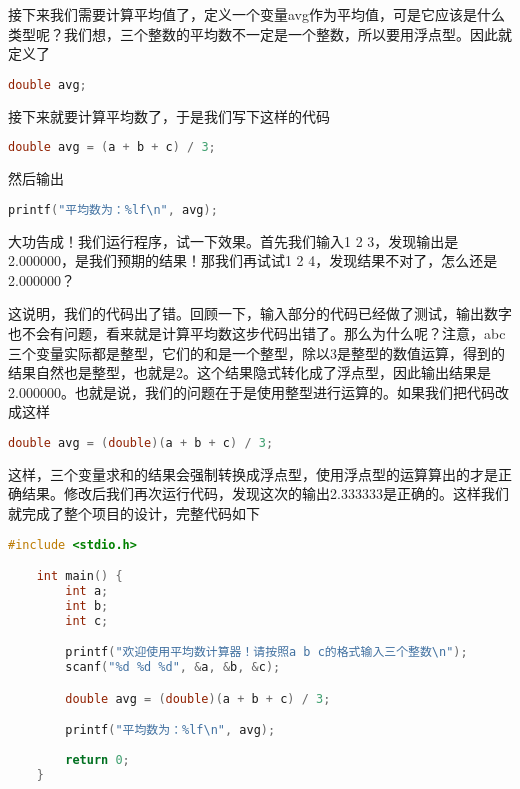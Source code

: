 接下来我们需要计算平均值了，定义一个变量avg作为平均值，可是它应该是什么类型呢？我们想，三个整数的平均数不一定是一个整数，所以要用浮点型。因此就定义了

\begin{lstlisting}[language=C]
    double avg;
\end{lstlisting}

接下来就要计算平均数了，于是我们写下这样的代码

\begin{lstlisting}[language=C]
    double avg = (a + b + c) / 3;
\end{lstlisting}

然后输出

\begin{lstlisting}[language=C]
    printf("平均数为：%lf\n", avg); 
\end{lstlisting}

大功告成！我们运行程序，试一下效果。首先我们输入1 2 3，发现输出是2.000000，是我们预期的结果！那我们再试试1 2 4，发现结果不对了，怎么还是2.000000？

这说明，我们的代码出了错。回顾一下，输入部分的代码已经做了测试，输出数字也不会有问题，看来就是计算平均数这步代码出错了。那么为什么呢？注意，abc三个变量实际都是整型，它们的和是一个整型，除以3是整型的数值运算，得到的结果自然也是整型，也就是2。这个结果隐式转化成了浮点型，因此输出结果是2.000000。也就是说，我们的问题在于是使用整型进行运算的。如果我们把代码改成这样

\begin{lstlisting}[language=C]
    double avg = (double)(a + b + c) / 3;
\end{lstlisting}

这样，三个变量求和的结果会强制转换成浮点型，使用浮点型的运算算出的才是正确结果。修改后我们再次运行代码，发现这次的输出2.333333是正确的。这样我们就完成了整个项目的设计，完整代码如下

\begin{lstlisting}[language=C]
    #include <stdio.h>

    int main() {
        int a;
        int b;
        int c;

        printf("欢迎使用平均数计算器！请按照a b c的格式输入三个整数\n");
        scanf("%d %d %d", &a, &b, &c);

        double avg = (double)(a + b + c) / 3;

        printf("平均数为：%lf\n", avg);
        
        return 0;
    }
\end{lstlisting}
